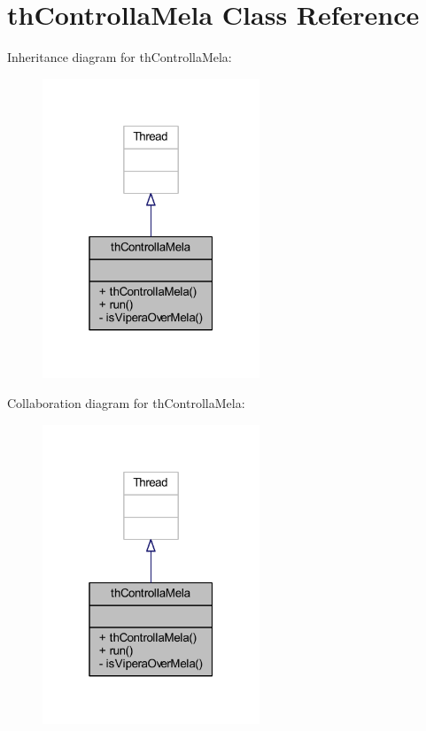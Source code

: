 \hypertarget{class_snake_1_1game_1_1threads_1_1th_controlla_mela}{}\section{th\+Controlla\+Mela Class Reference}
\label{class_snake_1_1game_1_1threads_1_1th_controlla_mela}


Inheritance diagram for th\+Controlla\+Mela\+:
\nopagebreak
\begin{figure}[H]
\begin{center}
\leavevmode
\includegraphics[width=184pt]{class_snake_1_1game_1_1threads_1_1th_controlla_mela__inherit__graph}
\end{center}
\end{figure}


Collaboration diagram for th\+Controlla\+Mela\+:
\nopagebreak
\begin{figure}[H]
\begin{center}
\leavevmode
\includegraphics[width=184pt]{class_snake_1_1game_1_1threads_1_1th_controlla_mela__coll__graph}
\end{center}
\end{figure}
